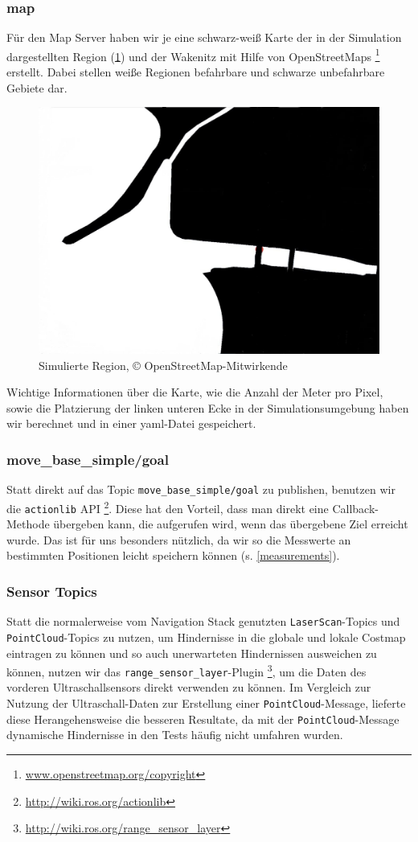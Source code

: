 \documentclass[11pt]{article}
\begin{document}
\subsubsection{map}

Für den Map Server haben wir je eine schwarz-weiß Karte der in der Simulation dargestellten Region (\ref{diluvio}) und der Wakenitz mit Hilfe von OpenStreetMaps \footnote{\url{www.openstreetmap.org/copyright}} erstellt. Dabei stellen weiße Regionen befahrbare und schwarze unbefahrbare Gebiete dar.

\begin{figure}[h]
	\centering
	\includegraphics[width=0.7\linewidth]{diluvio.jpg}
	\caption{Simulierte Region, © OpenStreetMap-Mitwirkende}
	\label{diluvio}
\end{figure}

Wichtige Informationen über die Karte, wie die Anzahl der Meter pro Pixel, sowie die Platzierung der linken unteren Ecke in der Simulationsumgebung haben wir berechnet und in einer yaml-Datei gespeichert.

\subsubsection{move\_base\_simple/goal} \label{goal}
Statt direkt auf das Topic \texttt{move\_base\_simple/goal} zu publishen, benutzen wir die \texttt{actionlib} API \footnote{\url{http://wiki.ros.org/actionlib}}. Diese hat den Vorteil, dass man direkt eine Callback-Methode übergeben kann, die aufgerufen wird, wenn das übergebene Ziel erreicht wurde. Das ist für uns besonders nützlich, da wir so die Messwerte an bestimmten Positionen leicht speichern können (s. \ref{measurements}).

\subsubsection{Sensor Topics} \label{sensor-topics}
Statt die normalerweise vom Navigation Stack genutzten \texttt{LaserScan}-Topics und \texttt{PointCloud}-Topics zu nutzen, um Hindernisse in die globale und lokale Costmap eintragen zu können und so auch unerwarteten Hindernissen ausweichen zu können, nutzen wir das \texttt{range\_sensor\_layer}-Plugin \footnote{\url{http://wiki.ros.org/range_sensor_layer}}, um die Daten des vorderen Ultraschallsensors direkt verwenden zu können. Im Vergleich zur Nutzung der Ultraschall-Daten zur Erstellung einer \texttt{PointCloud}-Message, lieferte diese Herangehensweise die besseren Resultate, da mit der \texttt{PointCloud}-Message dynamische Hindernisse in den Tests häufig nicht umfahren wurden.
\end{document}
